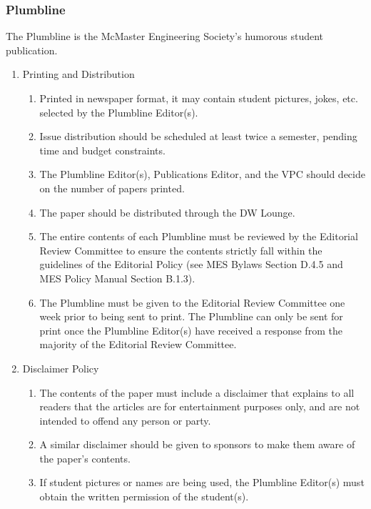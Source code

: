 \hypertarget{plumbline}{%
 \subsubsection{Plumbline}
 \label{plumbline}}
The Plumbline is the McMaster Engineering Society's humorous student
publication.

\begin{enumerate}
 \item
  Printing and Distribution

  \begin{enumerate}
   \item
    Printed in newspaper format, it may contain student pictures, jokes,
    etc. selected by the Plumbline Editor(s).
   \item
    Issue distribution should be scheduled at least twice a semester,
    pending time and budget constraints.
   \item
    The Plumbline Editor(s), Publications Editor, and the VPC should
    decide on the number of papers printed.
   \item
    The paper should be distributed through the DW Lounge.
   \item
    The entire contents of each Plumbline must be reviewed by the
    Editorial Review Committee to ensure the contents strictly fall
    within the guidelines of the Editorial Policy (see MES Bylaws
    Section D.4.5 and MES Policy Manual Section B.1.3).
   \item
    The Plumbline must be given to the Editorial Review Committee one
    week prior to being sent to print. The Plumbline can only be sent
    for print once the Plumbline Editor(s) have received a response from
    the majority of the Editorial Review Committee.
  \end{enumerate}
 \item
  Disclaimer Policy

  \begin{enumerate}
   \item
    The contents of the paper must include a disclaimer that explains to
    all readers that the articles are for entertainment purposes only,
    and are not intended to offend any person or party.
   \item
    A similar disclaimer should be given to sponsors to make them aware
    of the paper's contents.
   \item
    If student pictures or names are being used, the Plumbline Editor(s)
    must obtain the written permission of the student(s).

  \end{enumerate}
\end{enumerate}

